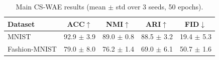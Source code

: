 \begin{table}[t]
\centering
\caption{Main CS-WAE results (mean $\pm$ std over 3 seeds, 50 epochs).}
\label{tab:main-results}
\begin{tabular}{lcccc}
\toprule
Dataset & ACC$\uparrow$ & NMI$\uparrow$ & ARI$\uparrow$ & FID$\downarrow$ \\
\midrule
MNIST & 92.9 $\pm$ 3.9 & 89.0 $\pm$ 0.8 & 88.5 $\pm$ 3.2 & 19.4 $\pm$ 5.3 \\
Fashion-MNIST & 79.0 $\pm$ 8.0 & 76.2 $\pm$ 1.4 & 69.0 $\pm$ 6.1 & 50.7 $\pm$ 1.6 \\
\bottomrule
\end{tabular}
\end{table}